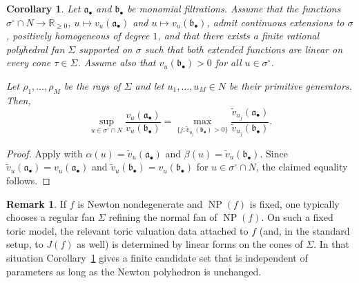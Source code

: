 \documentclass[12pt]{amsart}
\newcommand{\RR}{\mathbb{R}}
\renewcommand{\a}{\mathfrak{a}}
\renewcommand{\b}{\mathfrak{b}}
\DeclareMathOperator{\NP}{NP}
\newcommand{\abul}{{\a_\bullet}}
\newcommand{\bbul}{{\b_\bullet}}
\theoremstyle{plain}
\newtheorem{corollary}[theorem]{Corollary}
\theoremstyle{definition}
\newtheorem{remark}[theorem]{Remark}
\numberwithin{equation}{section}
\begin{document}
\begin{corollary}\label{cor:finite-max-toric-polyhedral}
	Let $\abul$ and $\bbul$ be monomial filtrations. Assume that the functions
	$\sigma^\circ\cap N \to \RR_{\ge 0}$, $u\mapsto v_u(\abul)$ and $u\mapsto v_u(\bbul)$, admit continuous extensions to $\sigma$, positively homogeneous of degree $1$, and that there exists a finite rational polyhedral fan $\Sigma$ supported on $\sigma$ such that both extended functions are linear on every cone $\tau\in\Sigma$. Assume also that $v_u(\bbul)>0$ for all $u\in\sigma^\circ$.
	
	Let $\rho_1,\dots,\rho_M$ be the rays of $\Sigma$ and let $u_1,\dots,u_M\in N$ be their primitive generators. Then,
	$$
	\sup_{u\in\sigma^\circ\cap N}\frac{v_u(\abul)}{v_u(\bbul)}
	=
	\max_{\{j:\widetilde v_{u_j}(\bbul)>0\}}
	\frac{\widetilde v_{u_j}(\abul)}{\widetilde v_{u_j}(\bbul)}.
	$$
\end{corollary}

\begin{proof}
	Apply  with $\alpha(u)=\widetilde v_u(\abul)$ and $\beta(u)=\widetilde v_u(\bbul)$. Since $\widetilde v_u(\abul)=v_u(\abul)$ and $\widetilde v_u(\bbul)=v_u(\bbul)$ for $u\in\sigma^\circ\cap N$, the claimed equality follows.
\end{proof}

\begin{remark}\label{rem:where-C-applies}
	If $f$ is Newton nondegenerate and $\NP(f)$ is fixed, one typically chooses a regular fan $\Sigma$ refining the normal fan of $\NP(f)$.
	On such a fixed toric model, the relevant toric valuation data attached to $f$ (and, in the standard setup, to $J(f)$ as well) is determined by linear forms on the cones of $\Sigma$.
	In that situation Corollary~\ref{cor:finite-max-toric-polyhedral} gives a finite candidate set that is independent of parameters as long as the Newton polyhedron is unchanged.
\end{remark}
\end{document}
